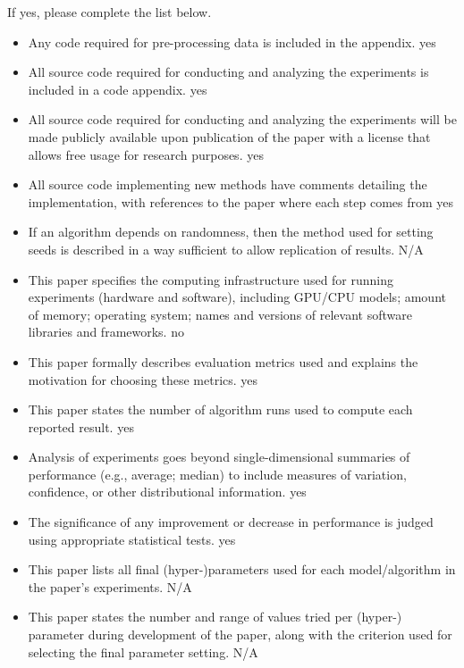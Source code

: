 If yes, please complete the list below.
\begin{itemize}
    \item Any code required for pre-processing data is included in the appendix. yes
    \item All source code required for conducting and analyzing the experiments is included in a code appendix. yes
    \item All source code required for conducting and analyzing the experiments will be made publicly available upon publication of the paper with a license that allows free usage for research purposes. yes
    \item All source code implementing new methods have comments detailing the implementation, with references to the paper where each step comes from yes
    \item If an algorithm depends on randomness, then the method used for setting seeds is described in a way sufficient to allow replication of results. N/A
    \item This paper specifies the computing infrastructure used for running experiments (hardware and software), including GPU/CPU models; amount of memory; operating system; names and versions of relevant software libraries and frameworks. no
    \item This paper formally describes evaluation metrics used and explains the motivation for choosing these metrics. yes
    \item This paper states the number of algorithm runs used to compute each reported result. yes
    \item Analysis of experiments goes beyond single-dimensional summaries of performance (e.g., average; median) to include measures of variation, confidence, or other distributional information. yes
    \item The significance of any improvement or decrease in performance is judged using appropriate statistical tests. yes
    \item This paper lists all final (hyper-)parameters used for each model/algorithm in the paper’s experiments.  N/A
    \item This paper states the number and range of values tried per (hyper-) parameter during development of the paper, along with the criterion used for selecting the final parameter setting. N/A
\end{itemize}




